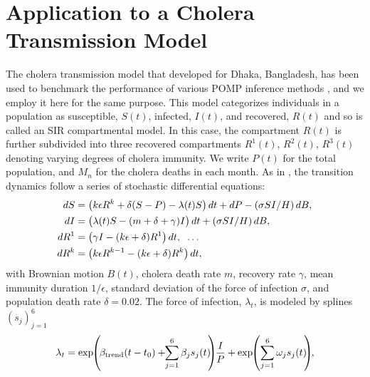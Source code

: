 \documentclass[9pt,twocolumn,pnasresearcharticle]{pnas-new}
\begin{document}
\section{Application to a Cholera Transmission Model}

The cholera transmission model that \cite{king08} developed for Dhaka, Bangladesh, has been used to benchmark the performance of various POMP inference methods \cite{ionides15, fasiolo16, wycoff24}, and we employ it here for the same purpose.
This model categorizes individuals in a population as susceptible, $S(t)$, infected, $I(t)$, and recovered, $R(t)$ and so is called an SIR compartmental model.
In this case, the compartment $R(t)$ is further subdivided into 
three recovered compartments $R^1(t)$, $R^2(t)$, $R^3(t)$ denoting varying degrees of cholera immunity.
We write $P(t)$ for the total population, and $M_n$ for the cholera deaths in each month.
As in \cite{king08, ionides15}, the transition dynamics follow a series of stochastic differential equations:
\vspace*{-1mm}
\begin{align*}
    dS&=\big(k \epsilon R^k+\delta(S-P)-\lambda(t) S\big)\, dt+d P-({\sigma S I}/{H})\, dB, \\
    dI&=\big(\lambda(t) S-(m+\delta+\gamma) I\big)\, dt+({\sigma S I}/{H})\, dB, \\
    dR^1&=\big(\gamma I-(k \epsilon+\delta) R^1\big)\, dt, \hspace{2mm} \dots \\
    dR^k&=\big(k \epsilon R^{k-1} -(k \epsilon+\delta) R^k\big)\, dt,
    \vspace*{-2mm}
\end{align*}
with Brownian motion $B(t)$, cholera death rate $m$, recovery rate $\gamma$, mean immunity duration $1/\epsilon$, standard deviation of the force of infection $\sigma$, and population death rate $\delta=0.02$. The force of infection, $\lambda_t$, is modeled by splines $(s_j)_{j=1}^6$
\vspace*{-2mm}
\begin{equation*}    \lambda_t=\exp\hspace{-1mm}\left(\hspace{-.5mm}\beta_{\text{trend}}(t-t_0)+\hspace{-1mm}\sum_{j=1}^{6} \beta_j s_j(t)\hspace{-1mm}\right)\hspace{-1mm}\frac{I}{P} + \exp\hspace{-1mm} \left(\sum_{j=1}^{6} \omega_j s_j(t)\hspace{-1mm}\right)\hspace{-1mm},
    \vspace*{-2mm}
\end{equation*}
\end{document}

